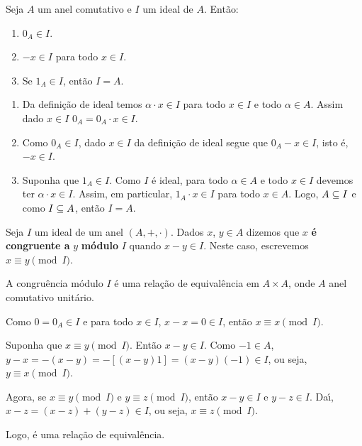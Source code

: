 \begin{proposicao}
	Seja $A$ um anel comutativo e $I$ um ideal de $A$. Ent{\~a}o:
	\begin{enumerate}[label={\roman*})]
	 	\item $0_{A}\in I$.
	 	\item $-x \in I$ para todo $x \in I$.
	 	\item Se $1_A \in I$, ent\~ao $I = A$.
	\end{enumerate}
\end{proposicao}
\begin{prova}
	\begin{enumerate}[label={\roman*})]
		\item Da defini\c{c}\~ao de ideal temos $\alpha \cdot x \in I$ para todo $x \in I$ e todo $\alpha \in A$.
		Assim dado $x \in I$ $0_A = 0_A \cdot x \in I$.

		\item Como $0_A \in I$, dado $x \in I$ da defini\c{c}\~ao de ideal segue que $0_A - x \in I$, isto \'e, $-x \in I$.

		\item Suponha que $1_A \in I$. Como $I$ {\'e} ideal, para todo $\alpha \in A$ e todo $x \in I$ devemos ter $\alpha\cdot x \in I$. Assim, em particular, $1_A \cdot x \in I$ para todo $x \in A$. Logo, $A\subseteq I$ e como $I\subseteq A$, ent{\~a}o $I = A$.
	\end{enumerate}
\end{prova}

\begin{definicao}
	Seja $I$ um ideal de um anel $(A, +, \cdot)$. Dados $x$, $y \in A$ dizemos que $x$ \textbf{\'e congruente a} $y$ \textbf{m\'odulo} $I$ quando $x-y \in I$. Neste caso, escrevemos $x\equiv y \pmod I$.
\end{definicao}

\begin{proposicao}
	A congru{\^e}ncia m{\'o}dulo $I$ {\'e} uma rela{\c c}{\~a}o de equival{\^e}ncia em $A \times A$, onde $A$ anel comutativo unit{\'a}rio.
\end{proposicao}
\begin{prova}
	Como $0 = 0_{A} \in I$ e para todo $x \in I$, $x - x = 0 \in I$, ent{\~a}o $x \equiv x \pmod I$.

	Suponha que $x\equiv y \pmod I$. Ent{\~a}o $x - y \in I$. Como $-1 \in A$, $y - x = -(x - y) = -[(x - y)1] = (x - y)(-1) \in I$, ou seja, $y\equiv x \pmod I$.

	Agora, se $x\equiv y \pmod I$ e $y\equiv z \pmod I$, ent{\~a}o $x - y \in I$ e $y - z \in I$. Da{\'\i}, $x - z = (x - z) + (y - z)\in I$, ou seja, $x\equiv z \pmod I$.

	Logo, {\'e} uma rela{\c c}{\~a}o de equival{\^e}ncia.
\end{prova}

